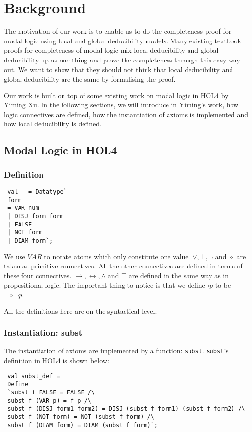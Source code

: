 \documentclass[submission,copyright,creativecommons]{eptcs}
\begin{document}
\section{Background}
The motivation of our work is to enable us to do the 
completeness proof for modal logic using local and global deducibility models. 
Many existing textbook proofs for completeness of modal logic mix 
local deducibility and global deducibility up as one thing and prove the completeness 
through this easy way out. We want to show that they should not 
think that local deducibility and global deducibility are the same by formalising 
the proof. 

Our work is built on top of some existing work on modal logic in HOL4\cite{yiming} by Yiming Xu.
In the following sections, we will introduce in Yiming's work, how logic connectives 
are defined, how the instantiation of axioms is implemented and how local 
deducibility is defined. 

\subsection{Modal Logic in HOL4}
\subsubsection{Definition}
\label{mldef}
\begin{verbatim}
 val _ = Datatype`
 form
 = VAR num
 | DISJ form form
 | FALSE
 | NOT form
 | DIAM form`;
\end{verbatim}
 
We use $VAR$ to notate atoms which only 
constitute one value. 
$\vee, \bot, \neg$ and $\diamond$ are taken as primitive connectives.
All the other connectives are defined in terms of these four connectives.
$\rightarrow, \leftrightarrow, \wedge$ and $\top$ are defined in the same way as 
in propositional logic. The important thing to notice is that we define 
$\square p$ to be $\neg \diamond \neg p$. 

All the definitions here are on the syntactical level. 


\subsubsection{Instantiation: subst}
The instantiation of axioms are implemented by a function: \texttt{subst}.
\texttt{subst}'s definition in HOL4 is shown below:
\begin{verbatim}
 val subst_def =
 Define
 `subst f FALSE = FALSE /\
 subst f (VAR p) = f p /\
 subst f (DISJ form1 form2) = DISJ (subst f form1) (subst f form2) /\
 subst f (NOT form) = NOT (subst f form) /\
 subst f (DIAM form) = DIAM (subst f form)`;
\end{verbatim}
\end{document}
